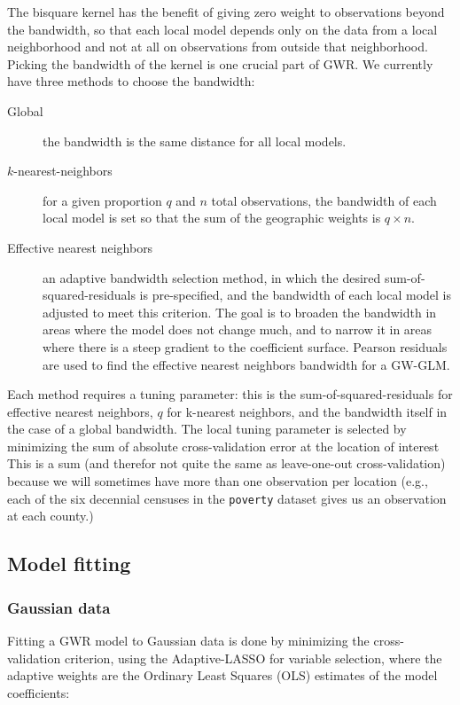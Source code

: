 \documentclass[authoryear, review, 11pt]{elsarticle}
\begin{document}
		The bisquare kernel has the benefit of giving zero weight to observations beyond the bandwidth, so that each local model depends only on the data from a local neighborhood and not at all on observations from outside that neighborhood.\\
		
		Picking the bandwidth of the kernel is one crucial part of GWR. We currently have three methods to choose the bandwidth:
		\begin{description}
			\item[Global] the bandwidth is the same distance for all local models.
			\item[$k$-nearest-neighbors] for a given proportion $q$ and $n$ total observations, the bandwidth of each local model is set so that the sum of the geographic weights is $q \times n$.
			\item[Effective nearest neighbors] an adaptive bandwidth selection method, in which the desired sum-of-squared-residuals is pre-specified, and the bandwidth of each local model is adjusted to meet this criterion. The goal is to broaden the bandwidth in areas where the model does not change much, and to narrow it in areas where there is a steep gradient to the coefficient surface. Pearson residuals are used to find the effective nearest neighbors bandwidth for a GW-GLM.
		\end{description}
		
		Each method requires a tuning parameter: this is the sum-of-squared-residuals for effective nearest neighbors, $q$ for k-nearest neighbors, and the bandwidth itself in the case of a global bandwidth. The local tuning parameter is selected by minimizing the sum of absolute cross-validation error at the location of interest This is a sum (and therefor not quite the same as leave-one-out cross-validation) because we will sometimes have more than one observation per location (e.g., each of the six decennial censuses in the \verb~poverty~ dataset gives us an observation at each county.)\\
		
		
	\subsection{Model fitting}
		\subsubsection{Gaussian data}
		Fitting a GWR model to Gaussian data is done by minimizing the cross-validation criterion, using the Adaptive-LASSO for variable selection, where the adaptive weights are the Ordinary Least Squares (OLS) estimates of the model coefficients:
\end{document}
